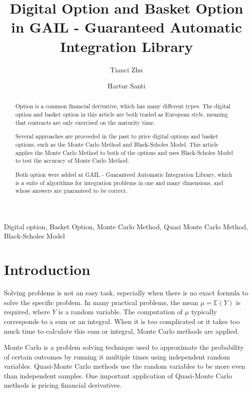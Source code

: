 \documentclass[]{elsarticle}
\theoremstyle{definition}
\theoremstyle{remark}
\begin{document}
\begin{frontmatter}
\title{Digital Option and Basket Option in GAIL - Guaranteed Automatic Integration Library}
\author{Tianci Zhu}
\author{Hartur Santi}
\address{Department of Applied Mathematics, Illinois Institute of Technology, Illinois, USA}

\begin{abstract}

Option is a common financial derivative, which has many different types. The digital option and basket option in this article are both traded as European style, meaning that contracts are only exercised on the maturity time.

Several approaches are proceeded in the past to price digital options and basket options, such as the Monte Carlo Method and Black-Scholes Model. This article applies the Monte Carlo Method to both of the options and uses Black-Scholes Model to test the accuracy of Monte Carlo Method.

Both option were added at GAIL - Guaranteed Automatic Integration Library, which is a suite of algorithms for integration problems in one and many dimensions, and whose answers are guaranteed to be correct.

\end{abstract}

\begin{keyword}

Digital option, Basket Option, Monte Carlo Method, Quasi Monte Carlo Method, Black-Scholes Model

\end{keyword}
\end{frontmatter}

\section{Introduction}

Solving problems is not an easy task, especially when there is no exact formula to solve the specific problem. In many practical problems, the mean $\mu=\mathbb{E}(Y)$ is required, where $Y$ is a random variable. The computation of $\mu$ typically corresponds to a sum or an integral. When it is too complicated or it takes too much time to calculate this sum or integral, Monte Carlo methods are applied.

Monte Carlo is a problem solving technique used to approximate the probability of certain outcomes by running it multiple times using independent random variables. Quasi-Monte Carlo methods use the random variables to be more even than independent samples. One important application of Quasi-Monte Carlo methods is pricing financial derivatives.
\end{document}
